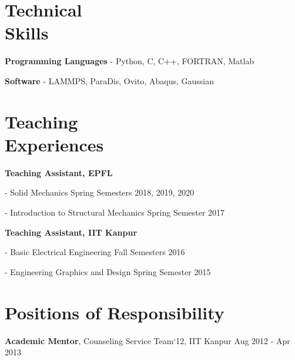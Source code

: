 \documentclass[margin,line]{resume}
\begin{document}
\begin{resume}
    \section{\mysidestyle Technical \\Skills}
    \textbf{\textsf{Programming Languages}} - Python, C, C++,  FORTRAN, Matlab

    \textbf{\textsf{Software}} -  LAMMPS, ParaDis, Ovito, Abaqus, Gaussian

    \section{\mysidestyle Teaching \\Experiences}

    \textbf{\textsf{Teaching Assistant, EPFL}}
    \vspace{-0.3cm}\begin{compactitem}
        \item[-] Solid Mechanics \hfill \small{Spring  Semesters 2018, 2019, 2020}
        \item[-] Introduction to Structural Mechanics  \hfill \small{Spring  Semester 2017}
    \end{compactitem}

    \textbf{\textsf{Teaching Assistant, IIT Kanpur}}
    \vspace{-0.3cm}\begin{compactitem}
        \item[-] Basic Electrical Engineering \hfill \small{Fall  Semesters 2016}
        \item[-] Engineering Graphics and Design  \hfill \small{Spring  Semester 2015}
    \end{compactitem}




    \section{\mysidestyle Positions of Responsibility}
    \textbf{\textsf{Academic Mentor}}, Counseling Service Team`12, IIT Kanpur \hfill \small{Aug 2012 - Apr 2013}


\end{resume}
\end{document}

